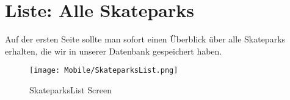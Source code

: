 \section{Liste: Alle Skateparks}
Auf der ersten Seite sollte man sofort einen Überblick über alle Skateparks erhalten, die wir in
unserer Datenbank gespeichert haben.

\begin{figure}[H]
  \begin{center}
    \texttt{[image: Mobile/SkateparksList.png]}
    \caption{SkateparksList Screen}
  \end{center}
\end{figure}